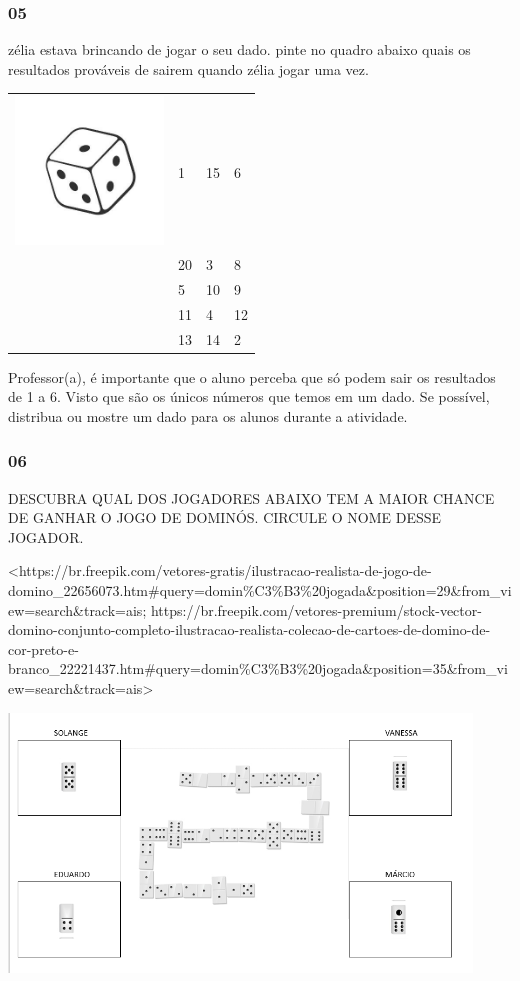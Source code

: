 \subsubsection{05}\label{section-67}

zélia estava brincando de jogar o seu dado. pinte no quadro abaixo quais
os resultados prováveis de sairem quando zélia jogar uma vez.

\begin{longtable}[]{@{}llll@{}}
\toprule
\includegraphics[width=1.55208in,height=1.55208in]{media/image86.jpg} &
1 & 15 & 6\tabularnewline
& 20 & 3 & 8\tabularnewline
& 5 & 10 & 9\tabularnewline
& 11 & 4 & 12\tabularnewline
& 13 & 14 & 2\tabularnewline
\bottomrule
\end{longtable}

Professor(a), é importante que o aluno perceba que só podem sair os
resultados de 1 a 6. Visto que são os únicos números que temos em um
dado. Se possível, distribua ou mostre um dado para os alunos durante a
atividade.

\subsubsection{06}\label{section-68}

DESCUBRA QUAL DOS JOGADORES ABAIXO TEM A MAIOR CHANCE DE GANHAR O JOGO
DE DOMINÓS. CIRCULE O NOME DESSE JOGADOR.

\textless{}https://br.freepik.com/vetores-gratis/ilustracao-realista-de-jogo-de-domino\_22656073.htm\#query=domin\%C3\%B3\%20jogada\&position=29\&from\_view=search\&track=ais;
https://br.freepik.com/vetores-premium/stock-vector-domino-conjunto-completo-ilustracao-realista-colecao-de-cartoes-de-domino-de-cor-preto-e-branco\_22221437.htm\#query=domin\%C3\%B3\%20jogada\&position=35\&from\_view=search\&track=ais\textgreater{}

\includegraphics[width=4.84499in,height=2.71476in]{media/image87.png}

